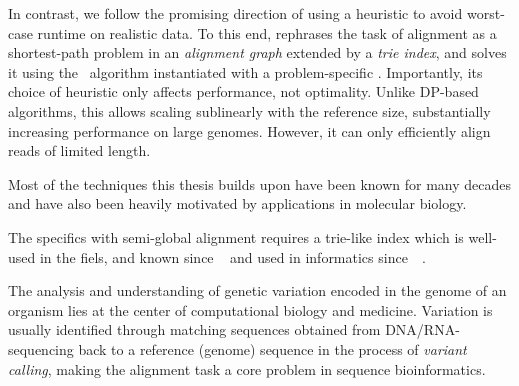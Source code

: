 In contrast, we follow the promising direction of using a heuristic to avoid
worst-case runtime on realistic data. To this end, \astarix rephrases the task
of alignment as a shortest-path problem in an \emph{alignment graph} extended by
a \emph{trie index}, and solves it using the \A~algorithm instantiated with a
problem-specific \prefixh. Importantly, its choice of heuristic only affects
performance, not optimality.
%
Unlike DP-based algorithms, this \prefixh allows scaling sublinearly with the
reference size, substantially increasing performance on large genomes. However,
it can only efficiently align reads of limited length.

Most of the techniques this thesis builds upon have been known for many decades
and have also been heavily motivated by applications in molecular biology. 

The specifics with semi-global alignment requires a trie-like index which is
well-used in the fiels, and known since
\citeyear{thue1912gegenseitige}~\cite{thue1912gegenseitige} and used in
informatics since~\citeyear{de1959file}~\cite{de1959file}.

The analysis and understanding of genetic variation encoded in the genome of an
organism lies at the center of computational biology and medicine. Variation is
usually identified through matching sequences obtained from DNA/RNA-sequencing
back to a reference (genome) sequence in the process of \emph{variant calling},
making the alignment task a core problem in sequence bioinformatics.